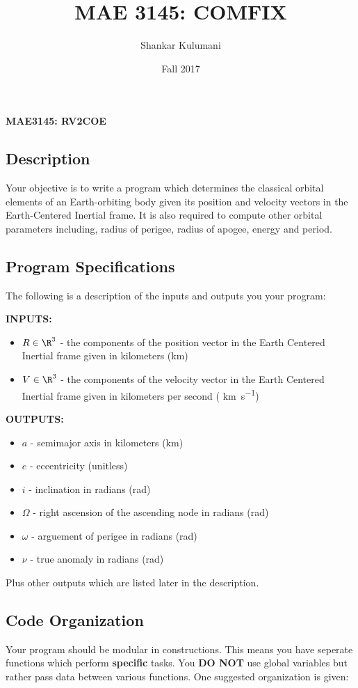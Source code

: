 \documentclass[11pt, reqno]{article}    %
\title{MAE 3145: COMFIX}
\author{Shankar Kulumani}
\date{Fall 2017}                          %
\begin{document}
\begin{center}
{\Large \textbf{MAE3145: RV2COE}}
\end{center}
\subsection*{Description}

Your objective is to write a program which determines the classical orbital elements of an Earth-orbiting body given its position and velocity vectors in the Earth-Centered Inertial frame.
It is also required to compute other orbital parameters including, radius of perigee, radius of apogee, energy and period.

\subsection*{Program Specifications}
The following is a description of the inputs and outputs you your program:

\noindent \textbf{INPUTS:}
\begin{itemize}
    \item \( R \in \R^{3} \) - the components of the position vector in the Earth Centered Inertial frame given in kilometers (\si{\kilo\meter})
    \item \( V \in \R^{3} \) - the components of the velocity vector in the Earth Centered Inertial frame given in kilometers per second ( \si{\kilo\meter\per\second})
\end{itemize}

\noindent \textbf{OUTPUTS:}
\begin{itemize}
    \item \( a \)  - semimajor axis in kilometers (\si{\kilo\meter})
    \item \( e \) - eccentricity (unitless)
    \item \( i \) - inclination in radians (\si{\radian})
    \item \( \Omega \) - right ascension of the ascending node in radians (\si{\radian})
    \item \( \omega \) - arguement of perigee in radians (\si{\radian})
    \item \( \nu \) - true anomaly in radians (\si{\radian})
\end{itemize}
Plus other outputs which are listed later in the description.

\subsection*{Code Organization} 
Your program should be modular in constructions. 
This means you have seperate functions which perform \textbf{specific} tasks.
You \textbf{DO NOT} use global variables but rather pass data between various functions.
One suggested organization is given:
\end{document}
